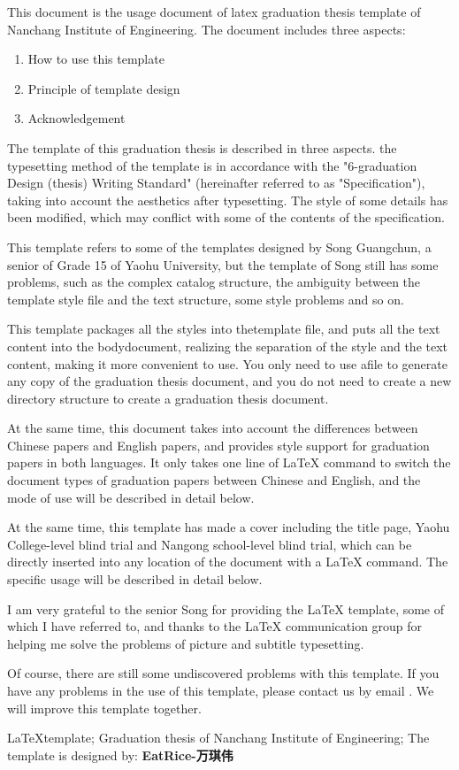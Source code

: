 \begin{Abstract}

    This document is the usage document of latex graduation thesis template of Nanchang Institute of Engineering. 
    The document includes three aspects:

    \begin{enumerate}
        \item How to use this template
        \item Principle of template design
        \item Acknowledgement
    \end{enumerate}

    The template of this graduation thesis is described in three aspects. the typesetting method of the template is in accordance with the "6-graduation Design (thesis) Writing Standard" (hereinafter referred to as "Specification"), taking into account the aesthetics after typesetting. The style of some details has been modified, which may conflict with some of the contents of the specification.

    This template refers to some of the templates designed by Song Guangchun, a senior of Grade 15 of Yaohu University, but the template of Song still has some problems, such as the complex catalog structure, the ambiguity between the template style file and the text structure, some style problems and so on. 

    This template packages all the styles into thetemplate file, and puts all the text content into the bodydocument, realizing the separation of the style and the text content, making it more convenient to use. You only need to use afile to generate any copy of the graduation thesis document, and you do not need to create a new directory structure to create a graduation thesis document. 

    At the same time, this document takes into account the differences between Chinese papers and English papers, and provides style support for graduation papers in both languages. It only takes one line of \LaTeX{} command to switch the document types of graduation papers between Chinese and English, and the mode of use will be described in detail below.

    At the same time, this template has made a cover including the title page, Yaohu College-level blind trial and Nangong school-level blind trial, which can be directly inserted into any location of the document with a \LaTeX{} command. The specific usage will be described in detail below.

    I am very grateful to the senior Song for providing the \LaTeX{} template, some of which I have referred to, and thanks to the \LaTeX{} communication group for helping me solve the problems of picture and subtitle typesetting.

    Of course, there are still some undiscovered problems with this template. If you have any problems in the use of this template, please contact us by email . We will improve this template together.

\end{Abstract}
\begin{KeyWords}
    \LaTeX template; 
    Graduation thesis of Nanchang Institute of Engineering; 
    The template is designed by: \textbf{EatRice-万琪伟}
\end{KeyWords}